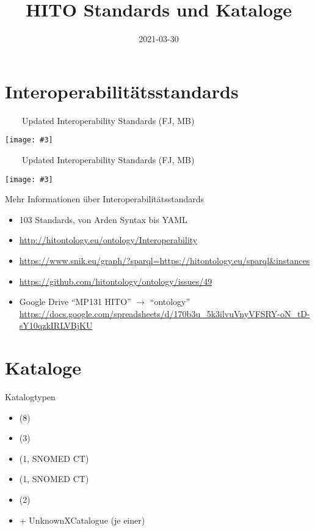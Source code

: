 \documentclass[aspectratio=1610]{beamer}
\title{HITO Standards und Kataloge}
\date{2021-03-30}
\newcommand{\imageslide}[4][]
{
\begin{frame}[plain]{~~~~#2}
\vspace{0.2em}
\begin{center}
\centering\texttt{[image: \#3]}
\end{center}
#1
\note{#4}
\end{frame}
}
\begin{document}
\begin{frame}
\titlepage
\end{frame}

\section{Interoperabilitätsstandards}
\imageslide{Updated Interoperability Standards (FJ, MB)}{img/interoperability.pdf}{}
\imageslide{Updated Interoperability Standards (FJ, MB)}{img/interoperability-marked.png}{}

\begin{frame}{Mehr Informationen über Interoperabilitätsstandards}
\begin{itemize}
\item 103 Standards, von Arden Syntax bis YAML
\item \url{http://hitontology.eu/ontology/Interoperability}
\item \url{https://www.snik.eu/graph/?sparql=https://hitontology.eu/sparql&instances}
\item \url{https://github.com/hitontology/ontology/issues/49}
\item Google Drive \enquote{MP131 HITO} $\rightarrow$ \enquote{ontology}\\
      \url{https://docs.google.com/spreadsheets/d/170b3u\_5k3ilvuVnyVFSRY-oN\_tD-sY10qzkIRLVBjKU}
\end{itemize}
\end{frame}

\section{Kataloge}

\begin{frame}{Katalogtypen}
\begin{itemize}
\item {} (8)
\item {} (3)
\item {} (1, SNOMED CT)
\item {} (1, SNOMED CT)
\item {} (2)
\item + UnknownXCatalogue (je einer)
\end{itemize}
\end{frame}
\end{document}
